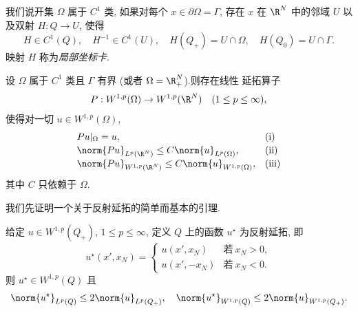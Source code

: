 \begin{definition}
我们说开集 $\Omega$ 属于 $C^1$ 类, 如果对每个 $x\in\partial\Omega=\Gamma$, 存在
$x$ 在 $\R^N$ 中的邻域 $U$ 以及双射 $H:Q\to U$, 使得
\begin{equation*}
H\in C^1(Q),\quad H^{-1}\in C^1(U),\quad
H(Q_+)=U\cap\Omega,\quad H(Q_0)=U\cap\Gamma.
\end{equation*}
映射 $H$ 称为\emph{局部坐标卡}.
\end{definition}

\begin{theorem}
\label{thm:9.7}
设 $\Omega$ 属于 $C^1$ 类且 $\Gamma$ 有界 (或者 $\Omega=\R^N_+$).则存在线性
延拓算子
\begin{equation*}
P:W^{1,p}(\Omega)\to W^{1,p}(\R^N)\quad(1\le p\le\infty),
\end{equation*}
使得对一切 $u\in W^{1,p}(\Omega)$,
\begin{equation*}
\begin{array}{ll}
Pu|_\Omega=u, & \text{(i)}\\[2pt]
\norm{Pu}_{L^p(\R^N)}\le C\norm{u}_{L^p(\Omega)}, & \text{(ii)}\\[2pt]
\norm{Pu}_{W^{1,p}(\R^N)}\le C\norm{u}_{W^{1,p}(\Omega)}, & \text{(iii)}
\end{array}
\end{equation*}
其中 $C$ 只依赖于 $\Omega$.
\end{theorem}

我们先证明一个关于反射延拓的简单而基本的引理.

\begin{lemma}
\label{lem:9.2}
给定 $u\in W^{1,p}(Q_+)$, $1\le p\le\infty$, 定义 $Q$ 上的函数
$u^\star$ 为反射延拓, 即
\begin{equation*}
u^\star(x',x_N)=
\begin{cases}
u(x',x_N) & \text{若}\ x_N>0,\\
u(x',-x_N) & \text{若}\ x_N<0.
\end{cases}
\end{equation*}
则 $u^\star\in W^{1,p}(Q)$ 且
\begin{equation*}
\norm{u^\star}_{L^p(Q)}\le2\norm{u}_{L^p(Q_+)},\quad
\norm{u^\star}_{W^{1,p}(Q)}\le2\norm{u}_{W^{1,p}(Q_+)}.
\end{equation*}
\end{lemma}

